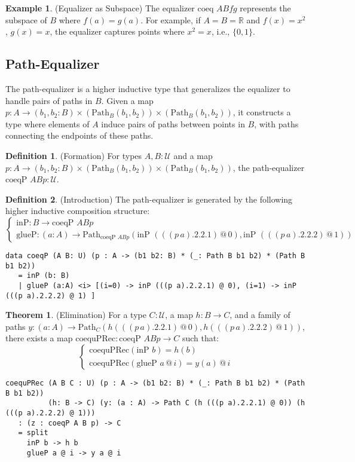 \documentclass{article}
\theoremstyle{definition}
\newtheorem{theorem}{Theorem}
\newtheorem{definition}{Definition}
\newtheorem{example}{Example}
\begin{document}
\begin{example} (Equalizer as Subspace)
The equalizer $\text{coeq } A B f g$ represents the subspace
of $B$ where $f(a) = g(a)$. For example, if $A = B = \mathbb{R}$
and $f(x) = x^2$, $g(x) = x$, the equalizer captures points
where $x^2 = x$, i.e., $\{0, 1\}$.
\end{example}

\subsection{Path-Equalizer}
The path-equalizer is a higher inductive type that generalizes
the equalizer to handle pairs of paths in $B$. Given a
map $p : A \to (b_1, b_2 : B) \times (\text{Path}_B (b_1, b_2)) \times (\text{Path}_B (b_1, b_2))$,
it constructs a type where elements of $A$ induce pairs
of paths between points in $B$, with paths connecting
the endpoints of these paths.

\begin{definition} (Formation)
For types $A, B : \mathcal{U}$ and a map $p : A \to (b_1, b_2 : B) \times (\text{Path}_B (b_1, b_2)) \times (\text{Path}_B (b_1, b_2))$, the path-equalizer $\text{coeqP } A B p : \mathcal{U}$.
\end{definition}

\begin{definition} (Introduction)
The path-equalizer is generated by the following higher inductive composition structure:
\[
\begin{cases}
\text{inP} : B \to \text{coeqP } A B p \\
\text{glueP} : (a : A) \to \text{Path}_{\text{coeqP } A B p} (\text{inP } (((p \, a).2.2.1) \, @ \, 0), \text{inP } (((p \, a).2.2.2) \, @ \, 1))
\end{cases}
\]
\begin{lstlisting}
data coeqP (A B: U) (p : A -> (b1 b2: B) * (_: Path B b1 b2) * (Path B b1 b2))
   = inP (b: B)
   | glueP (a:A) <i> [(i=0) -> inP (((p a).2.2.1) @ 0), (i=1) -> inP (((p a).2.2.2) @ 1) ]
\end{lstlisting}
\end{definition}

\begin{theorem} (Elimination)
For a type $C : \mathcal{U}$, a map $h : B \to C$, and a family of paths $y : (a : A) \to \text{Path}_C (h (((p \, a).2.2.1) \, @ \, 0), h (((p \, a).2.2.2) \, @ \, 1))$, there exists a map $\text{coequPRec} : \text{coeqP } A B p \to C$ such that:
\[
\begin{cases}
\text{coequPRec}(\text{inP } b) = h(b) \\
\text{coequPRec}(\text{glueP } a \, @ \, i) = y(a) \, @ \, i
\end{cases}
\]
\begin{lstlisting}
coequPRec (A B C : U) (p : A -> (b1 b2: B) * (_: Path B b1 b2) * (Path B b1 b2))
          (h: B -> C) (y: (a : A) -> Path C (h (((p a).2.2.1) @ 0)) (h (((p a).2.2.2) @ 1)))
   : (z : coeqP A B p) -> C
   = split
     inP b -> h b
     glueP a @ i -> y a @ i
\end{lstlisting}
\end{theorem}
\end{document}

